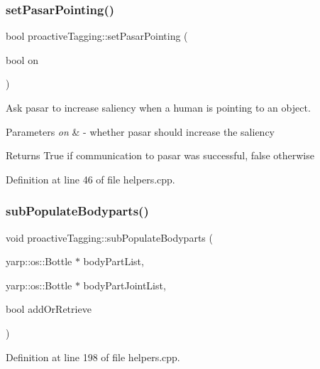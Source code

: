 \subsubsection{\texorpdfstring{set\+Pasar\+Pointing()}{setPasarPointing()}}
{\footnotesize\ttfamily bool proactive\+Tagging\+::set\+Pasar\+Pointing (\begin{DoxyParamCaption}\item[{bool}]{on }\end{DoxyParamCaption})\hspace{0.3cm}{\ttfamily [protected]}}



Ask pasar to increase saliency when a human is pointing to an object. 


\begin{DoxyParams}{Parameters}
{\em on} & -\/ whether pasar should increase the saliency \\
\hline
\end{DoxyParams}
\begin{DoxyReturn}{Returns}
True if communication to pasar was successful, false otherwise 
\end{DoxyReturn}


Definition at line 46 of file helpers.\+cpp.

\mbox{\label{classproactiveTagging_ae3566ba1d23f67b927f2fe4e624505d2}} 
\subsubsection{\texorpdfstring{sub\+Populate\+Bodyparts()}{subPopulateBodyparts()}}
{\footnotesize\ttfamily void proactive\+Tagging\+::sub\+Populate\+Bodyparts (\begin{DoxyParamCaption}\item[{yarp\+::os\+::\+Bottle $\ast$}]{body\+Part\+List,  }\item[{yarp\+::os\+::\+Bottle $\ast$}]{body\+Part\+Joint\+List,  }\item[{bool}]{add\+Or\+Retrieve }\end{DoxyParamCaption})\hspace{0.3cm}{\ttfamily [protected]}}



Definition at line 198 of file helpers.\+cpp.

